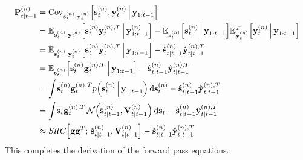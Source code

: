 			\begin{align}
				\boldsymbol{\mathrm{P}}_{t \vert t - 1}^{(n)}
					&= \operatorname{Cov}_{\boldsymbol{\mathrm{s}}_t^{(n)}, \boldsymbol{\mathrm{y}}_t^{(n)}}\!\Big[\boldsymbol{\mathrm{s}}_t^{(n)}, \boldsymbol{\mathrm{y}}_t^{(n)} \,\Big\vert\, \boldsymbol{\mathrm{y}}_{1:t - 1}\Big]  \nonumber \\
					&= \mathbb{E}_{\boldsymbol{\mathrm{s}}_t^{(n)}, \boldsymbol{\mathrm{y}}_t^{(n)}}\Big[\boldsymbol{\mathrm{s}}_t^{(n)} \boldsymbol{\mathrm{y}}_t^{(n), T} \,\Big\vert\, \boldsymbol{\mathrm{y}}_{1:t - 1}^{(n)}\Big] - \mathbb{E}_{\boldsymbol{\mathrm{s}}_t^{(n)}}\Big[\boldsymbol{\mathrm{s}}_t^{(n)} \,\Big\vert\, \boldsymbol{\mathrm{y}}_{1:t - 1}\Big] \mathbb{E}_{\boldsymbol{\mathrm{y}}_t^{(n)}}^T\Big[\boldsymbol{\mathrm{y}}_t^{(n)} \,\Big\vert\, \boldsymbol{\mathrm{y}}_{1:t - 1}\Big]  \nonumber \\
					&= \mathbb{E}_{\boldsymbol{\mathrm{s}}_t^{(n)}, \boldsymbol{\mathrm{y}}_t^{(n)}}\Big[\boldsymbol{\mathrm{s}}_t^{(n)} \boldsymbol{\mathrm{y}}_t^{(n), T} \,\Big\vert\, \boldsymbol{\mathrm{y}}_{1:t - 1}\Big] - \hat{\boldsymbol{\mathrm{s}}}_{t \vert t - 1}^{(n)} \hat{\boldsymbol{\mathrm{y}}}_{t \vert t - 1}^{(n), T}  \nonumber \\
					&= \mathbb{E}_{\boldsymbol{\mathrm{s}}_t^{(n)}}\Big[\boldsymbol{\mathrm{s}}_t^{(n)} \boldsymbol{\mathrm{g}}_t^{(n), T} \,\Big\vert\, \boldsymbol{\mathrm{y}}_{1:t - 1}\Big] - \hat{\boldsymbol{\mathrm{s}}}_{t \vert t - 1}^{(n)} \hat{\boldsymbol{\mathrm{y}}}_{t \vert t - 1}^{(n), T}  \nonumber \\
					&= \int\! \boldsymbol{\mathrm{s}}_t^{(n)} \boldsymbol{\mathrm{g}}_t^{(n), T} p\Big(\boldsymbol{\mathrm{s}}_t^{(n)} \,\Big\vert\, \boldsymbol{\mathrm{y}}_{1:t - 1}\Big) \dd{\boldsymbol{\mathrm{s}}_t^{(n)}} - \hat{\boldsymbol{\mathrm{s}}}_{t \vert t - 1}^{(n)} \hat{\boldsymbol{\mathrm{y}}}_{t \vert t - 1}^{(n), T}  \nonumber \\
					&= \int\! \boldsymbol{\mathrm{s}}_t \boldsymbol{\mathrm{g}}_t^{(n), T} \,\mathcal{N}\Big(\hat{\boldsymbol{\mathrm{s}}}_{t \vert t - 1}^{(n)}, \boldsymbol{\mathrm{V}}_{t \vert t - 1}^{(n)}\Big) \dd{\boldsymbol{\mathrm{s}}_t} - \hat{\boldsymbol{\mathrm{s}}}_{t \vert t - 1}^{(n)} \hat{\boldsymbol{\mathrm{y}}}_{t \vert t - 1}^{(n), T}  \nonumber \\
					&\approx \mathit{SRC}\Big[ \boldsymbol{\mathrm{g}} \boldsymbol{\mathrm{g}}^T;\, \hat{\boldsymbol{\mathrm{s}}}_{t \vert t - 1}^{(n)}, \boldsymbol{\mathrm{V}}_{t \vert t - 1}^{(n)} \Big] - \hat{\boldsymbol{\mathrm{s}}}_{t \vert t - 1}^{(n)} \hat{\boldsymbol{\mathrm{y}}}_{t \vert t - 1}^{(n), T}  \label{eq:cubatureK}
			\end{align}
			This completes the derivation of the forward pass equations.


